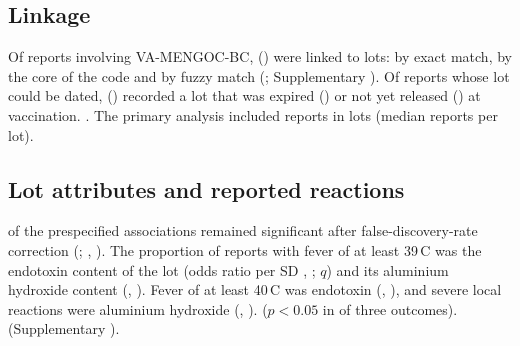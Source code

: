 \documentclass[11pt]{article}
\begin{document}
\subsection{Linkage}\label{sec:r-link}
Of \PTNTargetReports{} reports involving VA-MENGOC-BC, \PTNLinked{} (\PTLinkRate) were linked to
\PTNLinkedLots{} lots: \PTLinkExact{} by exact match, \PTLinkCore{} by the core of the code and
\PTLinkFuzzy{} by fuzzy match (; Supplementary ). Of
\PTLotAssessable{} reports whose lot could be dated, \PTLotInconsistent{} (\PTLotInconsistentPct)
recorded a lot that was expired (\PTLotExpired) or not yet released (\PTLotBeforeRelease) at
vaccination. \PTFeasibilitySentence. The primary analysis included \PTNAnalysed{} reports in
\PTNAnalysedLots{} lots (median \PTReportsPerLot{} reports per lot).

\subsection{Lot attributes and reported reactions}\label{sec:r-assoc}
\PTNSignificantFDR{} of the \PTNPrimaryTests{} prespecified associations remained significant after
false-discovery-rate correction (\PTSignificantList; , ). The
proportion of reports with fever of at least 39\,\textdegree{}C was
\PTEvFeverThreeNineEndotoxinDir{} the endotoxin content of the lot (odds ratio per SD
\PTEvFeverThreeNineEndotoxinOR, \CI{} \PTEvFeverThreeNineEndotoxinCI; $q$\PTEvFeverThreeNineEndotoxinQ)
and \PTEvFeverThreeNineAlohThreeConcDir{} its aluminium hydroxide content (\PTEvFeverThreeNineAlohThreeConcOR,
\CI{} \PTEvFeverThreeNineAlohThreeConcCI). Fever of at least 40\,\textdegree{}C was
\PTEvFeverFourZeroEndotoxinDir{} endotoxin (\PTEvFeverFourZeroEndotoxinOR, \CI{}
\PTEvFeverFourZeroEndotoxinCI), and severe local reactions were \PTEvSevereLocalReactionAlohThreeConcDir{}
aluminium hydroxide (\PTEvSevereLocalReactionAlohThreeConcOR, \CI{}
\PTEvSevereLocalReactionAlohThreeConcCI). \PTNegControlSentence{} ($p<0.05$ in \PTNNegControlNominal{} of three outcomes). \PTSensSentence{} (Supplementary
).

\begin{table}[tbp]
\centering\small
\caption{Association between lot attributes and the reactions reported with VA-MENGOC-BC
(case-only design). Odds ratios per SD of the attribute between lots, from logistic generalised
estimating equations clustered by lot, crude and adjusted for age, sex, dose, co-administration and
year;
$q$, Benjamini--Hochberg adjusted $p$ within the prespecified family (the negative control is
outside the family).}
\label{tab:gee}
\PTTableGEE
\end{table}
\end{document}
